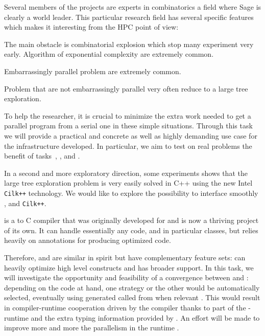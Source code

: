 \begin{workpackage}
\begin{tasklist}
\begin{task}[title=HPC infrastructure for combinatorics,id=hpc-combi]
  Several members of the projects are experts in combinatorics a field where
  Sage is clearly a world leader. This particular research field has several
  specific features which makes it interesting from the HPC point of view:
  \begin{compactitem}
  \item The main obstacle is combinatorial explosion which stop many
    experiment very early. Algorithm of exponential complexity are extremely
    common.
  \item Embarrassingly parallel problem are extremely common.
  \item Problem that are not embarrassingly parallel very often reduce to a
    large tree exploration.
  \end{compactitem}
  To help the researcher, it is crucial to minimize the extra work needed to get a
  parallel program from a serial one in these simple situations. Through this task we will
  provide a practical and concrete as well as highly demanding use case for the
  infrastructure developed. In particular, we aim to test on real problems the benefit of
  tasks~, ,
  and .

  In a second and more exploratory direction, some experiments shows that the
  large tree exploration problem is very easily solved in C++ using the new
  Intel \texttt{Cilk++} technology. We would like to explore the possibility to
  interface smoothly \Pythran, \Cython and \texttt{Cilk++}.
\end{task}

\begin{task}[title=Pythran-Cython convergence,id=pythran-cython]
  \Cython is a \Python to C compiler that was originally developed for
  \Sage and is now a thriving project of its own. It can handle
  essentially any \Python code, and in particular classes, but relies
  heavily on annotations for producing optimized code.

  Therefore, \Pythran and \Cython are similar in spirit but have
  complementary feature sets: \Pythran can heavily optimize high level
  \Numpy constructs and \Cython has broader \Python support. In this
  task, we will investigate the opportunity and feasibility of a
  convergence between \Cython and \Pythran: depending on the code at
  hand, one strategy or the other would be automatically selected,
  eventually using \Pythran generated called from \Cython when
  relevant . This would result in compiler-runtime
  cooperation driven by the \Cython compiler thanks to part of the
  \Pythran-runtime and the extra typing information provided by \Cython. An
  effort will be made to improve more and more the parallelism in the
  \Pythran runtime .


\end{task}
\end{tasklist}
\end{workpackage}
